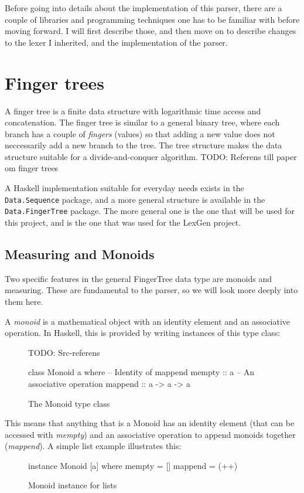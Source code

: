 \documentclass[a4paper,12pt,twosided]{report}
\begin{document}
Before going into details about the implementation of this parser, there are a
couple of libraries and programming techniques one has to be familiar with
before moving forward. I will first describe those, and then move on to describe
changes to the lexer I inherited, and the implementation of the parser.

\section{Finger trees}
A finger tree is a finite data structure with logarithmic time access and
concatenation. The finger tree is similar to a general binary tree, where each
branch has a couple of \textit{fingers} (values) so that adding a new value does
not neccessarily add a new branch to the tree. The tree structure makes the data
structure suitable for a divide-and-conquer algorithm. TODO: Referens till paper
om finger trees

A Haskell implementation suitable for everyday needs exists in the
\texttt{Data.Sequence} package, and a more general structure is available in the
\texttt{Data.FingerTree} package. The more general one is the one that will be
used for this project, and is the one that was used for the LexGen project.

\subsection{Measuring and Monoids}
Two specific features in the general FingerTree data type are monoids and
measuring. These are fundamental to the parser, so we will look more deeply into
them here.

A \textit{monoid} is a mathematical object with an identity element and an
associative operation. In Haskell, this is provided by writing instances of this
type class:
\begin{figure}[H]
TODO: Src-referens
\begin{code}
class Monoid a where
    -- Identity of mappend
    mempty  :: a
    -- An associative operation
    mappend :: a -> a -> a
\end{code}
\caption{The Monoid type class}
\end{figure}
This means that anything that is a Monoid has an identity element (that can be
accessed with \textit{mempty}) and an associative operation to append monoids
together (\textit{mappend}). A simple list example illustrates this:
\begin{figure}[H]
\begin{code}
instance Monoid [a] where
    mempty = []
    mappend = (++)
\end{code}
\caption{Monoid instance for lists}
\end{figure}
\end{document}
